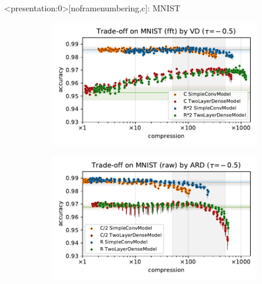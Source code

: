 \documentclass{beamer}
\begin{document}
\begin{frame}<presentation:0>[noframenumbering,c]{\insertsection: MNIST}
  \begin{figure}[t]
    \begin{subfigure}[b]{0.5\columnwidth}
      \centering
      \includegraphics[width=\linewidth]{figure__mnist-like__trade-off/appendix__cmp__VD__mnist__fft__-0.5.pdf}
    \end{subfigure}\hspace{-1em}%
    \begin{subfigure}[b]{0.5\columnwidth}
      \centering
      \includegraphics[width=\linewidth]{figure__mnist-like__trade-off/appendix__cmp__ARD__mnist__raw__-0.5.pdf}
    \end{subfigure} \\ %
    \begin{subfigure}[b]{0.5\columnwidth}

\end{subfigure}
\end{figure}
\end{frame}
\end{document}
